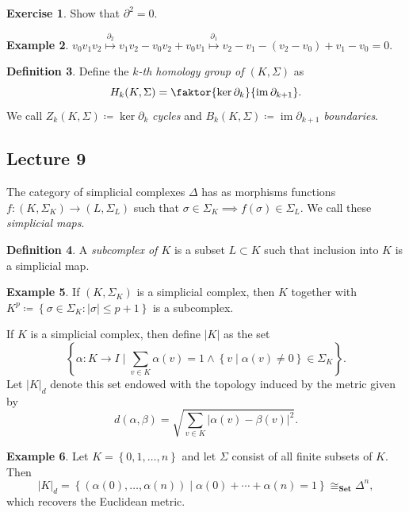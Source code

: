 \documentclass[10pt,letterpaper,cm]{nupset}
\theoremstyle{definition}
\newtheorem{definition}{Definition}[subsection]
\newtheorem{exmp}[definition]{Example}
\theoremstyle{theorem}
\newtheorem{exercise}[definition]{Exercise}
\theoremstyle{remark}
\newcommand{\1}{\mathbb{1}}
\newcommand{\0}{\vec 0}
\DeclareMathOperator{\im}{im}
\begin{document}
\begin{exercise}
Show that $\partial^2 =0$.
\end{exercise}

\begin{exmp}
$v_0v_1v_2 \overset{\partial_2}{\longmapsto}  v_1 v_2 - v_0v_2 + v_0v_1  \overset{\partial_1}{\longmapsto} v_2 - v_1 -\left(v_2 - v_0\right) + v_1 - v_0 =0 .$
\end{exmp}

\begin{definition}
Define the \textit{$k$-th homology group of $\left(K , \Sigma\right)$} as $$H_k(K, \Sigma) = \faktor{\ker{\partial_k}}{\im{\partial_{k+1}}}.$$ We call $Z_k(K, \Sigma)\coloneqq  \ker{\partial_k}$ \textit{cycles} and $B_k(K, \Sigma)\coloneqq  \im{\partial_{k+1}}$ \textit{boundaries}.
\end{definition}

\subsection{Lecture 9}


The category of simplicial complexes $\Delta$ has as morphisms functions $f: \left(K, \Sigma_K\right) \to \left(L, \Sigma_L\right)$ such that $\sigma \in \Sigma_K \implies f(\sigma) \in \Sigma_L$. We call these \textit{simplicial maps}.


\begin{definition}
A \textit{subcomplex of $K$} is a subset $L \subset K$ such that inclusion into $K$ is a simplicial map.
\end{definition}

\begin{exmp}
If $\left(K, \Sigma_K\right)$ is a simplicial complex, then $K$ together with $K^p \coloneqq   \left\{\sigma \in \Sigma_K : \left\lvert{\sigma}\right\rvert \leq p+1\right\}$ is a subcomplex.
\end{exmp}

\smallskip

If $K$ is a simplicial complex, then define $\left\lvert{K}\right\rvert$ as the set $$\left\{\alpha : K \to I \mid \sum_{v\in K} \alpha(v)=1 \land \left\{v \mid \alpha(v) \ne 0\right\} \in \Sigma_K\right\}.$$ Let $\left\lvert{K}\right\rvert_d$ denote this set endowed with the topology induced by the metric given by $$d(\alpha, \beta) = \sqrt{\sum_{v\in K} \left\lvert{\alpha(v) -\beta(v)}\right\rvert^2} .$$


\begin{exmp}
Let  $K= \left\{0, 1, \ldots, n\right\}$ and let $\Sigma$ consist of all finite subsets of $K$. Then $$\left\lvert{K}\right\rvert_d = \left\{ \left(\alpha(0), \ldots, \alpha(n)\right) \mid \alpha(0) + \cdots + \alpha(n) = 1\right\} \cong_{\mathbf{Set}} \Delta^n,$$ which recovers the Euclidean metric. 
\end{exmp}
\end{document}
